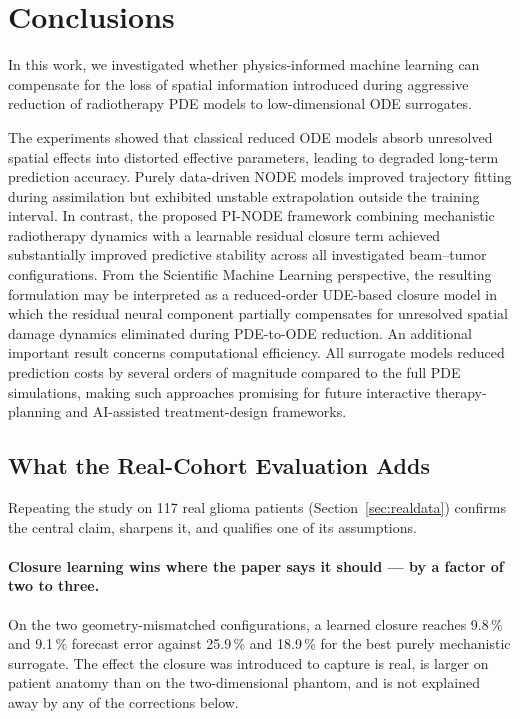 
\section{Conclusions}

In this work, we investigated whether physics-informed machine learning
can compensate for the loss of spatial information introduced during
aggressive reduction of radiotherapy PDE models to low-dimensional ODE
surrogates.

The experiments showed that classical reduced ODE models absorb
unresolved spatial effects into distorted effective parameters, leading
to degraded long-term prediction accuracy. Purely data-driven NODE
models improved trajectory fitting during assimilation but exhibited
unstable extrapolation outside the training interval.
In contrast, the proposed PI-NODE framework combining mechanistic
radiotherapy dynamics with a learnable residual closure term achieved
substantially improved predictive stability across all investigated
beam--tumor configurations. From the Scientific Machine Learning
perspective, the resulting formulation may be interpreted as a
reduced-order UDE-based closure model in which the residual neural
component partially compensates for unresolved spatial damage dynamics
eliminated during PDE-to-ODE reduction.
An additional important result concerns computational efficiency. All
surrogate models reduced prediction costs by several orders of magnitude
compared to the full PDE simulations, making such approaches promising
for future interactive therapy-planning and AI-assisted treatment-design
frameworks.

\subsection*{What the Real-Cohort Evaluation Adds}

Repeating the study on 117 real glioma patients
(Section~\ref{sec:realdata}) confirms the central claim, sharpens it, and
qualifies one of its assumptions.

\paragraph{Closure learning wins where the paper says it should --- by a factor
of two to three.} On the two geometry-mismatched configurations, a learned
closure reaches 9.8\,\% and 9.1\,\% forecast
error against 25.9\,\% and 18.9\,\% for the
best purely mechanistic surrogate. The effect the closure was introduced to
capture is real, is larger on patient anatomy than on the two-dimensional
phantom, and is not explained away by any of the corrections below.

